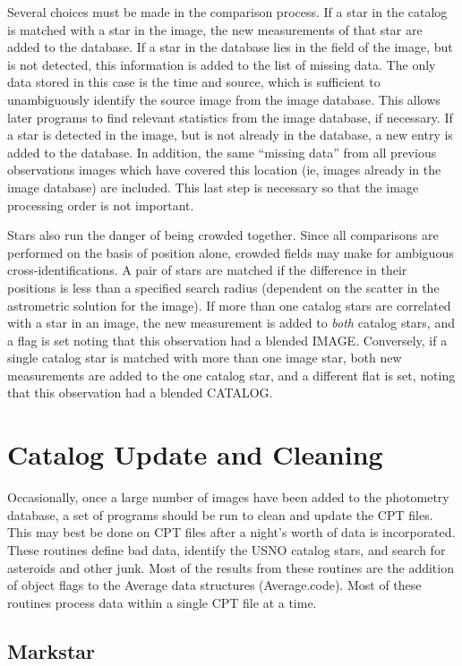 \documentclass{article}
\begin{document}
Several choices must be made in the comparison process.  If a star in
the catalog is matched with a star in the image, the new measurements
of that star are added to the database.  If a star in the database
lies in the field of the image, but is not detected, this information
is added to the list of missing data.  The only data stored in this
case is the time and source, which is sufficient to unambiguously
identify the source image from the image database.  This allows later
programs to find relevant statistics from the image database, if
necessary.  If a star is detected in the image, but is not already in
the database, a new entry is added to the database.  In addition, the
same ``missing data'' from all previous observations images which have
covered this location (ie, images already in the image database) are
included.  This last step is necessary so that the image processing
order is not important.  

Stars also run the danger of being crowded together.  Since all
comparisons are performed on the basis of position alone, crowded
fields may make for ambiguous cross-identifications.  A pair of stars
are matched if the difference in their positions is less than a
specified search radius (dependent on the scatter in the astrometric
solution for the image).  If more than one catalog stars are correlated
with a star in an image, the new measurement is added to {\em both}
catalog stars, and a flag is set noting that this observation had a
blended IMAGE.  Conversely, if a single catalog star is matched with
more than one image star, both new measurements are added to the one
catalog star, and a different flat is set, noting that this
observation had a blended CATALOG.

\section{Catalog Update and Cleaning}

Occasionally, once a large number of images have been added to the
photometry database, a set of programs should be run to clean and
update the CPT files.  This may best be done on CPT files after a
night's worth of data is incorporated.  These routines define bad
data, identify the USNO catalog stars, and search for asteroids and
other junk.  Most of the results from these routines are the addition
of object flags to the Average data structures (Average.code).  Most
of these routines process data within a single CPT file at a time.

\subsection{Markstar}
\end{document}
